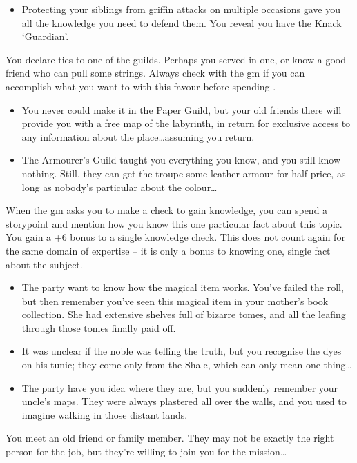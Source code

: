 \begin{multicols}{2}
\begin{itemize}
\item Protecting your siblings from griffin attacks on multiple occasions gave you all the knowledge you need to defend them.
You reveal you have the Knack `Guardian'.
\end{itemize}

You declare ties to one of the guilds.
Perhaps you served in one, or know a good friend who can pull some strings.
Always check with the \gls{gm} if you can accomplish what you want to with this favour before spending .

\begin{itemize}
  \item
  You never could make it in the Paper Guild, but your old friends there will provide you with a free map of the labyrinth, in return for exclusive access to any information about the place\ldots assuming you return.
  \item
  The Armourer's Guild taught you everything you know, and you still know nothing.
  Still, they can get the troupe some leather armour for half price, as long as nobody's particular about the colour\ldots
\end{itemize}

When the \gls{gm} asks you to make a check to gain knowledge, you can spend a \gls{storypoint} and mention how you know this one particular fact about this topic.
You gain a +6 bonus to a single knowledge check.
This does not count again for the same domain of expertise -- it is only a bonus to knowing one, single fact about the subject.

\begin{itemize}
\item
The party want to know how the magical item works.
You've failed the roll, but then remember you've seen this magical item in your mother's book collection.
She had extensive shelves full of bizarre tomes, and all the leafing through those tomes finally paid off.
  \item
  It was unclear if the noble was telling the truth, but you recognise the dyes on his tunic; they come only from the Shale, which can only mean one thing\ldots
  \item
  The party have you idea where they are, but you suddenly remember your uncle's maps.
  They were always plastered all over the walls, and you used to imagine walking in those distant lands.
\end{itemize}

\label{oldFriend}
You meet an old friend or family member.
They may not be exactly the right person for the job, but they're willing to join you for the mission\ldots


\end{multicols}

